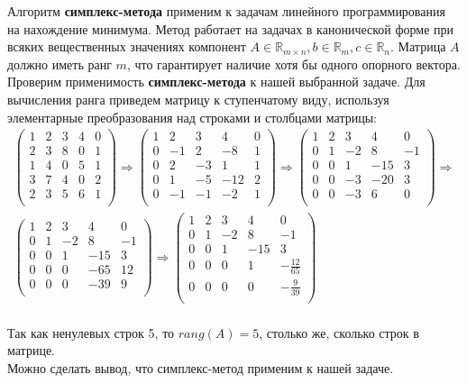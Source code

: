 \documentclass[../body.tex]{subfiles}
\begin{document}
	Алгоритм \textbf{симплекс-метода} применим к задачам линейного программирования на нахождение минимума. Метод работает на задачах в канонической форме при всяких вещественных значениях компонент $ A \in \mathbb{R}_{m\times{n}}, b \in \mathbb{R}_{m}, c \in \mathbb{R}_n $.
	Матрица $A$ должно иметь ранг $m$, что гарантирует наличие хотя бы одного опорного вектора.	
	\vspace{\baselineskip}
	\\Проверим применимость \textbf{симплекс-метода} к нашей выбранной задаче. Для вычисления ранга приведем матрицу к ступенчатому виду, используя элементарные преобразования над строками и столбцами матрицы: 
	\begin{multline}
		\begin{pmatrix}
			1 & 2 & 3 & 4 & 0 \\
			2 & 3 & 8 & 0 & 1 \\
			1 & 4 & 0 & 5 & 1 \\
			3 & 7 & 4 & 0 & 2 \\
			2 & 3 & 5 & 6 & 1 \\
		\end{pmatrix}
	\Longrightarrow
		\begin{pmatrix}
			1 & 2 & 3 & 4 & 0 \\
			0 & -1 & 2 & -8 & 1 \\
			0 & 2 & -3 & 1 & 1 \\
			0 & 1 & -5 & -12 & 2 \\
			0 & -1 & -1 & -2 & 1 \\
		\end{pmatrix}
	\Longrightarrow
		\begin{pmatrix}
			1 & 2 & 3 & 4 & 0 \\
			0 & 1 & -2 & 8 & -1 \\
			0 & 0 & 1 & -15 & 3 \\
			0 & 0 & -3 & -20 & 3 \\
			0 & 0 & -3 & 6 & 0 \\
		\end{pmatrix}
	\Longrightarrow \\
		\begin{pmatrix}
			1 & 2 & 3 & 4 & 0 \\
			0 & 1 & -2 & 8 & -1 \\
			0 & 0 & 1 & -15 & 3 \\
			0 & 0 & 0 & -65 & 12 \\
			0 & 0 & 0 & -39 & 9 \\
		\end{pmatrix}
	\Longrightarrow
		\begin{pmatrix}
			1 & 2 & 3 & 4 & 0 \\
			0 & 1 & -2 & 8 & -1 \\
			0 & 0 & 1 & -15 & 3 \\
			0 & 0 & 0 & 1 & -\frac{12}{65} \\
			0 & 0 & 0 & 0 & -\frac{9}{39} \\
		\end{pmatrix}
	\end{multline}\\
\vspace{\baselineskip}
Так как ненулевых строк 5, то $rang(A) = 5$, столько же, сколько строк в матрице.\\
\vspace{\baselineskip}
Можно сделать вывод, что симплекс-метод применим к нашей задаче.
\end{document}
